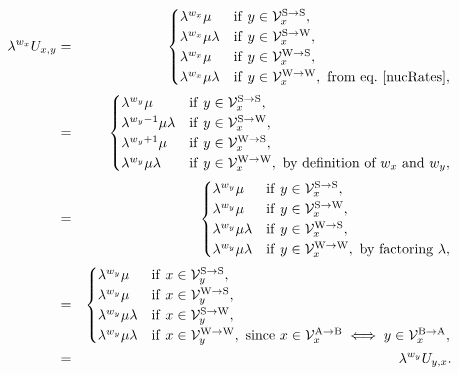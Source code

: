 \documentclass{article}
\newcommand{\Neighbor}{\mathcal{V}}
\newcommand{\NxAB}{\Neighbor_x^{\mathrm{A} \rightarrow \mathrm{B}}}
\newcommand{\NyBA}{\Neighbor_x^{\mathrm{B} \rightarrow \mathrm{A}}}
\newcommand{\NxWS}{\Neighbor_x^{\mathrm{W} \rightarrow \mathrm{S}}}
\newcommand{\NxSS}{\Neighbor_x^{\mathrm{S} \rightarrow \mathrm{S}}}
\newcommand{\NxSW}{\Neighbor_x^{\mathrm{S} \rightarrow \mathrm{W}}}
\newcommand{\NxWW}{\Neighbor_x^{\mathrm{W} \rightarrow \mathrm{W}}}
\newcommand{\NyWS}{\Neighbor_y^{\mathrm{W} \rightarrow \mathrm{S}}}
\newcommand{\NySS}{\Neighbor_y^{\mathrm{S} \rightarrow \mathrm{S}}}
\newcommand{\NySW}{\Neighbor_y^{\mathrm{S} \rightarrow \mathrm{W}}}
\newcommand{\NyWW}{\Neighbor_y^{\mathrm{W} \rightarrow \mathrm{W}}}
\begin{document}
    \begin{eqnarray}
        \lambda^{w_x} U_{x, y}
        & = &
        \begin{cases}
            \lambda^{w_x} \mu
            & \mathrm{if} \ y \in \NxSS, \\
            \lambda^{w_x} \mu \lambda
            & \mathrm{if} \ y \in \NxSW, \\
            \lambda^{w_x} \mu
            & \mathrm{if} \ y \in \NxWS, \\
            \lambda^{w_x} \mu \lambda
            & \mathrm{if} \ y \in \NxWW, \ \textrm{from eq.}\ \ref{nucRates},
        \end{cases} \\
        & = &
        \begin{cases}
            \lambda^{w_y} \mu
            & \mathrm{if} \ y \in \NxSS, \\
            \lambda^{w_y - 1} \mu \lambda
            & \mathrm{if} \ y \in \NxSW, \\
            \lambda^{w_y + 1} \mu
            & \mathrm{if} \ y \in \NxWS, \\
            \lambda^{w_y} \mu \lambda
            & \mathrm{if} \ y \in \NxWW, \ \textrm{by definition of} \ w_x \ \text{and} \ w_y,
        \end{cases} \\
        & = &
        \begin{cases}
            \lambda^{w_y} \mu
            & \mathrm{if} \ y \in \NxSS, \\
            \lambda^{w_y} \mu
            & \mathrm{if} \ y \in \NxSW, \\
            \lambda^{w_y} \mu \lambda
            & \mathrm{if} \ y \in \NxWS, \\
            \lambda^{w_y} \mu \lambda
            & \mathrm{if} \ y \in \NxWW, \ \textrm{by factoring} \ \lambda,
        \end{cases} \\
        & = &
        \begin{cases}
            \lambda^{w_y} \mu
            & \mathrm{if} \ x \in \NySS, \\
            \lambda^{w_y} \mu
            & \mathrm{if} \ x \in \NyWS, \\
            \lambda^{w_y} \mu \lambda
            & \mathrm{if} \ x \in \NySW, \\
            \lambda^{w_y} \mu \lambda
            & \mathrm{if} \ x \in \NyWW, \ \textrm{since} \ x \in \NxAB \iff y \in \NyBA,
        \end{cases} \\
        & = &
        \lambda^{w_y} U_{y,x}.
        \label{codonMutBalance}
    \end{eqnarray}
\end{document}
